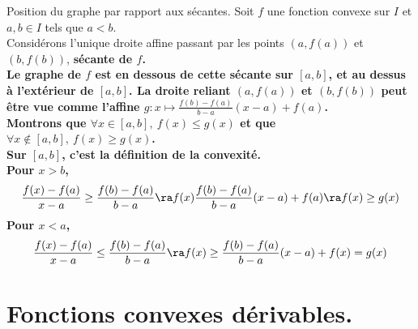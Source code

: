 \documentclass[11pt]{article}
\begin{document}
\begin{prop}{Position du graphe par rapport aux sécantes.}{}
    Soit $f$ une fonction convexe sur $I$ et $a,b\in I$ tels que $a<b$.\\
    Considérons l'unique droite affine passant par les points $(a,f(a))$ et $(b,f(b))$, \bf{sécante} de $f$.\\
    Le graphe de $f$ est en dessous de cette sécante sur $[a,b]$, et au dessus à l'extérieur de $[a,b]$.
    \tcblower
    La droite reliant $(a,f(a))$ et $(b,f(b))$ peut être vue comme l'affine $g:x\mapsto\frac{f(b)-f(a)}{b-a}(x-a)+f(a)$.\\
    Montrons que $\forall x \in [a,b], ~ f(x)\leq g(x)$ et que $\forall x \notin [a,b], ~ f(x)\geq g(x)$.\\
    Sur $[a,b]$, c'est la définition de la convexité.\\
    Pour $x>b$,
    \begin{equation*}
        \frac{f(x)-f(a)}{x-a}\geq\frac{f(b)-f(a)}{b-a} \ra f(x)\frac{f(b)-f(a)}{b-a}(x-a)+f(a)\ra f(x) \geq g(x)
    \end{equation*}
    Pour $x<a$,
    \begin{equation*}
        \frac{f(x)-f(a)}{x-a}\leq\frac{f(b)-f(a)}{b-a} \ra f(x) \geq \frac{f(b)-f(a)}{b-a}(x-a)+f(x)=g(x)
    \end{equation*}
\end{prop}

\section{Fonctions convexes dérivables.}
\end{document}
